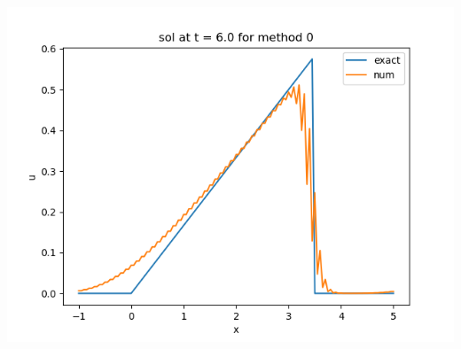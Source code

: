 \documentclass{article}
\begin{document}
\begin{enumerate}
\begin{center}
	\includegraphics[scale=.3]{hw13 sol t = 6 method 0}
\end{center}


\end{enumerate}
\end{document}

